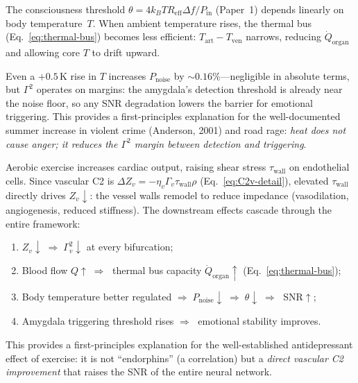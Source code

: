 \documentclass[aps,pre,twocolumn,superscriptaddress,floatfix]{revtex4-2}
\begin{document}
\begin{remark}
\label{rem:thermal-irritability}
The consciousness threshold
$\theta = 4 k_B T R_{\text{eff}} \Delta f / P_{\text{in}}$
(Paper~1) depends linearly on body temperature~$T$.
When ambient temperature rises, the thermal bus
(Eq.~\ref{eq:thermal-bus}) becomes less efficient:
$T_{\text{art}} - T_{\text{ven}}$ narrows, reducing
$\dot{Q}_{\text{organ}}$ and allowing core $T$
to drift upward.

Even a $+0.5$\,K rise in $T$ increases $P_{\text{noise}}$
by $\sim 0.16\%$---negligible in absolute terms, but
$\Gamma^2$ operates on margins: the amygdala's
detection threshold is already near the noise floor,
so any SNR degradation lowers the barrier for
emotional triggering.
This provides a first-principles explanation for the
well-documented summer increase in violent crime
(Anderson, 2001) and road rage:
\emph{heat does not cause anger; it reduces the
$\Gamma^2$ margin between detection and triggering}.
\end{remark}

\begin{remark}
\label{rem:exercise}
Aerobic exercise increases cardiac output, raising
shear stress $\tau_{\text{wall}}$ on endothelial cells.
Since vascular C2 is $\Delta Z_v = -\eta_v \Gamma_v
\tau_{\text{wall}} \rho$ (Eq.~\ref{eq:C2v-detail}),
elevated $\tau_{\text{wall}}$ directly drives
$Z_v \downarrow$: the vessel walls remodel to
reduce impedance (vasodilation, angiogenesis,
reduced stiffness).
The downstream effects cascade through the
entire framework:
\begin{enumerate}
  \item $Z_v \downarrow \;\Rightarrow\;
    \Gamma_v^2 \downarrow$ at every bifurcation;
  \item Blood flow $Q \uparrow \;\Rightarrow\;$
    thermal bus capacity $\dot{Q}_{\text{organ}}
    \uparrow$ (Eq.~\ref{eq:thermal-bus});
  \item Body temperature better regulated
    $\Rightarrow\; P_{\text{noise}} \downarrow
    \;\Rightarrow\; \theta \downarrow
    \;\Rightarrow\;$ SNR$\uparrow$;
  \item Amygdala triggering threshold rises
    $\Rightarrow\;$ emotional stability improves.
\end{enumerate}
This provides a first-principles explanation for the
well-established antidepressant effect of exercise:
it is not ``endorphins'' (a correlation) but a
\emph{direct vascular C2 improvement} that raises
the SNR of the entire neural network.
\end{remark}
\end{document}
